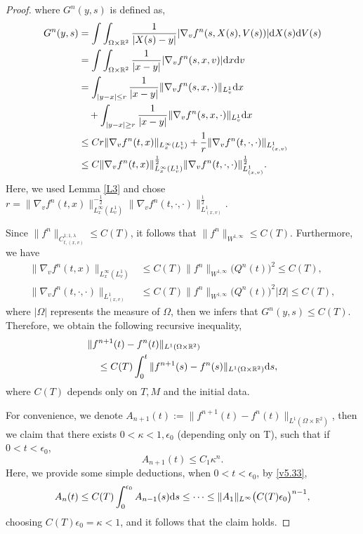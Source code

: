 \documentclass[11pt,reqno]{amsart}%
\theoremstyle{definition}
\theoremstyle{remark}
\begin{document}
\begin{proof}
where $G^{n}(y,s)$ is defined as,
\begin{align}
G^{n}(y,s)&=\int\int_{\Omega\times \mathbb{R}^{2}}\frac{1}{|X(s)-y|}|\nabla_{v}f^{n}(s,X(s),V(s))|{\rm d} X(s){\rm d} V(s)\nonumber\\
&=\int\int_{\Omega\times \mathbb{R}^{2}}\frac{1}{|x-y|}|\nabla_{v} f^{n}(s,x,v)|{\rm d} x{\rm d} v \nonumber\\
&=\int_{|y-x|\leq r}\frac{1}{|x-y|}\|\nabla_{v} f^{n}(s,x,\cdot)\|_{L^{1}_{v}}{\rm d} x\nonumber\\
&\quad+\int_{|y-x|\geq r}\frac{1}{|x-y|}\|\nabla_{v} f^{n}(s,x,\cdot)\|_{L^{1}_{v}}{\rm d} x \nonumber\\
&\leq C r \|\nabla _{v}f^{n}(t,x)\|_{L^{\infty}_{x}(L^{1}_{v})}+\frac{1}{r}\|\nabla _{v}f^{n}(t,\cdot,\cdot)\|_{L^{1}_{(x,v)}}\nonumber\\
&\leq C\|\nabla _{v}f^{n}(t,x)\|^{\frac{1}{2}}_{L^{\infty}_{x}(L^{1}_{v})}\|\nabla _{v}f^{n}(t,\cdot,\cdot)\|^{\frac{1}{2}}_{L^{1}_{(x,v)}}.\nonumber
\end{align}
Here, we used Lemma \ref{L3} and chose $r=\|\nabla _{v}f^{n}(t,x)\|^{-\frac{1}{2}}_{L^{\infty}_{x}(L^{1}_{v})}\|\nabla _{v}f^{n}(t,\cdot,\cdot)\|^{\frac{1}{2}}_{L^{1}_{(x,v)}}$.

Since $\|f^{n}\|_{C^{1;1,\lambda}_{t,(x,v)}}\leq C(T)$, it follows that $\|f^{n}\|_{W^{1,\infty}}\leq C(T)$. Furthermore, we  have %
\begin{align}
\|\nabla _{v}f^{n}(t,x)\|_{L^{\infty}_{x}(L^{1}_{v})}&\leq C(T)\|f^{n}\|_{W^{1,\infty}}\big(Q^{n}(t)\big)^{2}\leq C(T),\nonumber\\
\|\nabla _{v}f^{n}(t,\cdot,\cdot)\|_{L^{1}_{(x,v)}}&\leq C(T)\|f^{n}\|_{W^{1,\infty}}\big(Q^{n}(t)\big)^{2}|\Omega|\leq C(T),\nonumber
\end{align}
where $|\Omega|$ represents  the measure of $\Omega$, then we infers that $G^{n}(y,s)\leq C(T)$.
Therefore, we obtain the following recursive inequality,
\begin{align}
&\|f^{n+1}(t)-f^{n}(t)\|_{L^{1}(\Omega\times \mathbb{R}^{2})}\nonumber\\
&\quad \leq C(T)\int^{t}_{0}\|f^{n+1}(s)-f^{n}(s)\|_{L^{1}(\Omega\times \mathbb{R}^{2})}{\rm d}s, \label{v5.33}
\end{align}
where $C(T)$ depends only on $T,M$ and the initial data.

For convenience, we denote $A_{n+1}(t):=\|f^{n+1}(t)-f^{n}(t)\|_{L^{1}(\Omega\times \mathbb{R}^{2})}$, then
we claim that there exists $0<\kappa<1, \epsilon_{0}$ (depending only on T), such that if $0< t< \epsilon_{0}$,
$$A_{n+1}(t)\leq C_{1}\kappa^{n}.$$
Here, we provide some simple deductions, when $0< t< \epsilon_{0}$, by \eqref{v5.33},
\begin{align}
A_{n}(t)\leq C(T)\int^{\epsilon_{0}}_{0}A_{n-1}(s){\rm d}s\leq\cdots \leq \|A_{1}\|_{L^{\infty}}\big(C(T)\epsilon_{0}\big)^{n-1}, \nonumber
\end{align}
choosing $C(T)\epsilon_{0}=\kappa<1$,  and it follows that the claim holds.


\end{proof}
\end{document}
